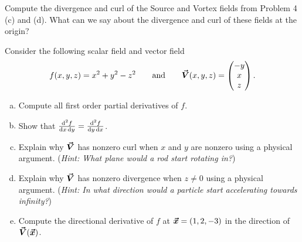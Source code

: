 \documentclass[12pt]{article} %
\begin{document}
\begin{problem}
Compute the divergence and curl of the Source and Vortex fields from Problem 4 (c) and (d).  What can we say about the divergence and curl of these fields at the origin?
\end{problem}

\begin{problem}
Consider the following scalar field and vector field
\[
f(x,y,z) = x^2+y^2-z^2 \qquad \textrm{and} \qquad \boldsymbol{\vec{V}}(x,y,z) = \begin{pmatrix} -y \\ x \\ z \end{pmatrix}.
\]
\begin{enumerate}[(a)]
    \item Compute all first order partial derivatives of $f$.
    \item Show that $\frac{\mathop{}\!\mathrm{d}^2 f}{\mathop{}\!\mathrm{d} x \mathop{}\!\mathrm{d} y} = \frac{\mathop{}\!\mathrm{d}^2 f}{\mathop{}\!\mathrm{d} y \mathop{}\!\mathrm{d} x}$.
    \item Explain why $\boldsymbol{\vec{V}}$ has nonzero curl when $x$ and $y$ are nonzero using a physical argument. (\emph{Hint: What plane would a rod start rotating in?})
    \item Explain why $\boldsymbol{\vec{V}}$ has nonzero divergence when $z\neq 0$ using a physical argument. (\emph{Hint: In what direction would a particle start accelerating towards infinity?})
    \item Compute the directional derivative of $f$ at $\boldsymbol{\vec{x}} = (1,2,-3)$ in the direction of $\boldsymbol{\vec{V}}(\boldsymbol{\vec{x}})$.
\end{enumerate}
\end{problem}
\end{document}

